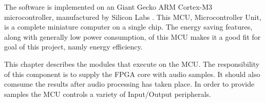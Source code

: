 
The software is implemented on an Giant Gecko ARM Cortex-M3 microcontroller, 
manufactured by Silicon Labs . 
This MCU, Microcontroller Unit, is a complete miniature computer on a single chip. 
The energy saving features, along with generally low power consumption, of this MCU 
makes it a good fit for goal of this project, namly energy efficiency. 

This chapter describes the modules that execute on the MCU. The responsibility 
of this component is to supply the FPGA core  with audio 
samples. It should also comsume the results after audio processing has taken 
place. In order to provide samples the MCU controls a variety of Input/Output 
peripherals. 


